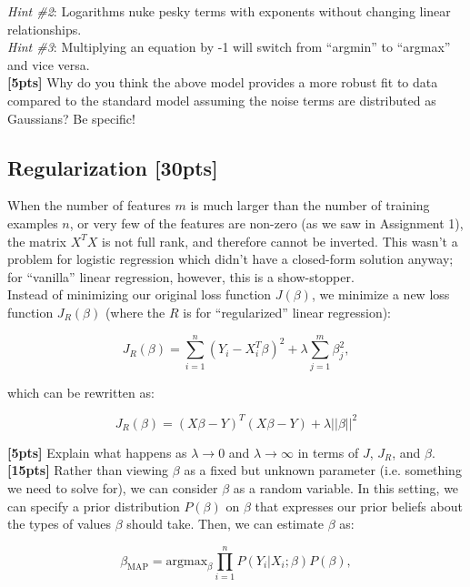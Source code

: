 \documentclass[paper=a4, fontsize=11pt]{scrartcl} %
\numberwithin{figure}{section} %
\numberwithin{table}{section} %
\begin{document}
\emph{Hint \#2}: Logarithms nuke pesky terms with exponents without changing linear relationships. \\

\emph{Hint \#3}: Multiplying an equation by -1 will switch from ``argmin'' to ``argmax'' and vice versa. \\

\textbf{[5pts]} Why do you think the above model provides a more robust fit to data compared to the standard model assuming the noise terms are distributed as Gaussians? Be specific!

\subsection{Regularization \textbf{[30pts]}}

When the number of features $m$ is much larger than the number of training examples $n$, or very few of the features are non-zero (as we saw in Assignment 1), the matrix $X^TX$ is not full rank, and therefore cannot be inverted. This wasn't a problem for logistic regression which didn't have a closed-form solution anyway; for ``vanilla'' linear regression, however, this is a show-stopper. \\

Instead of minimizing our original loss function $J(\beta)$, we minimize a new loss function $J_R(\beta)$ (where the $R$ is for ``regularized'' linear regression):

$$
J_R(\beta) = \sum_{i = 1}^n (Y_i - X_i^T \beta)^2 + \lambda \sum_{j = 1}^m \beta_j^2,
$$

which can be rewritten as:

\begin{equation}
J_R(\beta) = (X\beta - Y)^T(X\beta - Y) + \lambda ||\beta||^2
\label{eq:reg}
\end{equation}

\textbf{[5pts]} Explain what happens as $\lambda \rightarrow 0$ and $\lambda \rightarrow \infty$ in terms of $J$, $J_R$, and $\beta$. \\

\textbf{[15pts]} Rather than viewing $\beta$ as a fixed but unknown parameter (i.e. something we need to solve for), we can consider $\beta$ as a random variable. In this setting, we can specify a prior distribution $P(\beta)$ on $\beta$ that expresses our prior beliefs about the types of values $\beta$ should take. Then, we can estimate $\beta$ as:

\begin{equation}
\beta_{\textrm{MAP}} = \textrm{argmax}_{\beta} \prod_{i = 1}^n P(Y_i | X_i; \beta) P(\beta),
\label{eq:map}
\end{equation}
\end{document}
